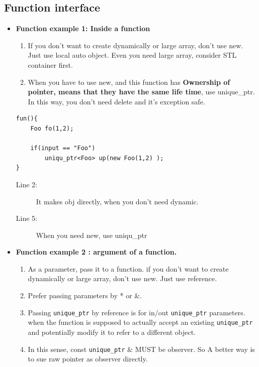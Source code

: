 \documentclass[a4paper,11pt,twoside]{book}
\begin{document}
\begin{itemize}
\end{itemize}

\subsection{Function interface}

\begin{itemize}

\item \textbf{Function example 1: Inside a function}
\begin{enumerate}
\item If you don't want to create dynamically or large array, don't use new. Just use local auto object. Even you need large array, consider STL container first.
\item When you have to use new, and this function has \textbf{Ownership of pointer, means that they have the same life time},  use unique\_ptr. In this way, you don't need delete and it's exception safe.
\end{enumerate}
\begin{lstlisting}[numbers=none]
fun(){
	Foo fo(1,2);
	
	if(input == "Foo")
		uniqu_ptr<Foo> up(new Foo(1,2) );
}
\end{lstlisting}
\begin{description}
	\item[Line 2:] It makes obj directly, when you don't need dynamic.
	\item[Line 5:] When you need new, use uniqu\_ptr
\end{description}


\item \textbf{Function example 2 : argument of a function.}
\begin{enumerate}
\item As a parameter, pass it to a function. if you don't want to create dynamically or large array, don't use new. Just use reference.

\item Prefer passing parameters by * or \&.

\item Passing \texttt{unique\_ptr} by reference is for in/out \texttt{unique\_ptr} parameters. when the function is supposed to actually accept an existing \texttt{unique\_ptr} and potentially modify it to refer to a different object. 

\item In this sense, const \texttt{unique\_ptr} \& MUST be observer. So A better way is to sue raw pointer as observer directly.


\end{enumerate}
\end{itemize}
\end{document}
